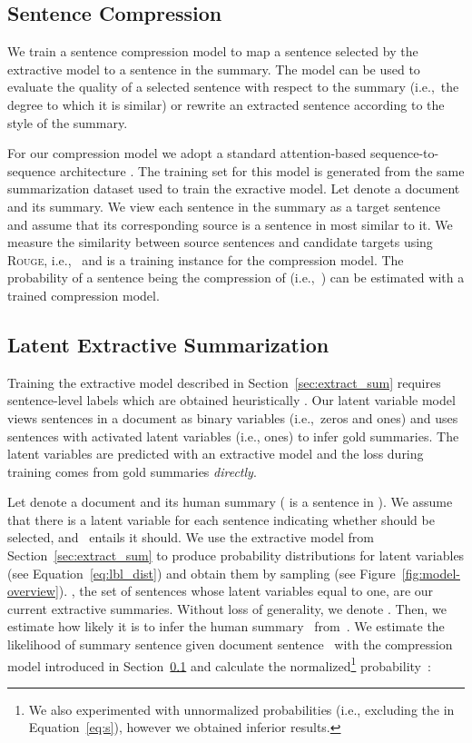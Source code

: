 \documentclass[11pt,a4paper]{article}
\begin{document}
\subsection{Sentence Compression}
\label{sec:compress}


We train a sentence compression model to map a sentence selected by
the extractive model to a sentence in the summary. The model can be
used to evaluate the quality of a selected sentence with respect to
the summary (i.e.,~the degree to which it is similar) or rewrite an
extracted sentence according to the style of the summary. 

For our compression model we adopt a standard attention-based
sequence-to-sequence architecture
\cite{bahdanau:2015:iclr,rush:2015:emnlp}. The training set for this
model is generated from the same summarization dataset used to train
the exractive model.  Let  denote a document and  its summary. We view each sentence  in
the summary as a target sentence and assume that its corresponding
source is a sentence in  most similar to it. We measure
the similarity between source sentences and candidate targets using
\textsc{Rouge}, i.e.,~ and
 is a training instance for the compression
model. The probability of a sentence  being the compression
of  (i.e.,~) can be
estimated with a trained compression model.


\subsection{Latent Extractive Summarization} 
\label{sec:latent}
Training the extractive model described in
Section~\ref{sec:extract_sum} requires sentence-level labels which are
obtained heuristically \cite{cheng:2016:acl,nallapati:2017:aaai}.  Our
latent variable model views sentences in a document as binary
variables (i.e.,~zeros and ones) and uses sentences with activated
latent variables (i.e., ones) to infer gold summaries. The latent
variables are predicted with an extractive model and the loss during
training comes from gold summaries \emph{directly}.



Let  denote a
document and  its
human summary ( is a sentence in ). We assume that
there is a latent variable  for each sentence 
indicating whether  should be selected, and~ entails it
should.  We use the extractive model from
Section~\ref{sec:extract_sum} to produce probability distributions for
latent variables (see Equation~\eqref{eq:lbl_dist}) and obtain them by
sampling  (see
Figure~\ref{fig:model-overview}).
, the set of sentences whose latent
variables equal to one, are our current extractive summaries. Without
loss of generality, we denote
. Then, we estimate how
likely it is to infer the human summary~
from~. We estimate the likelihood of summary sentence
 given document sentence~ with the compression model
introduced in Section~\ref{sec:compress} and calculate the
normalized\footnote{We also experimented with unnormalized
  probabilities (i.e., excluding the  in Equation~\eqref{eq:s}),
  however we obtained inferior results.}  probability~:
\end{document}
